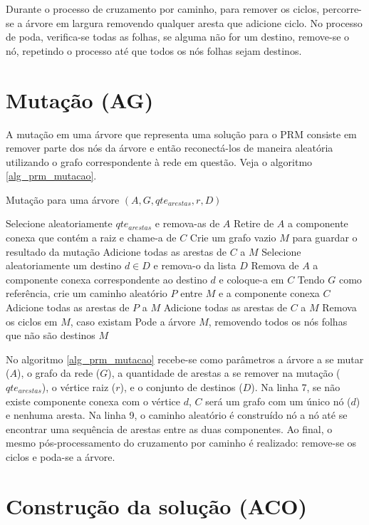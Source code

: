 Durante o processo de cruzamento por caminho, para remover os ciclos, percorre-se a árvore em largura removendo qualquer aresta que adicione ciclo. No processo de poda, verifica-se todas as folhas, se alguma não for um destino, remove-se o nó, repetindo o processo até que todos os nós folhas sejam destinos.

\section{Mutação (AG)}

A mutação em uma árvore que representa uma solução para o PRM consiste em remover parte dos nós da árvore e então reconectá-los de maneira aleatória utilizando o grafo correspondente à rede em questão. Veja o algoritmo \ref{alg_prm_mutacao}.

\begin{algorithm}
	\caption{Mutação para uma árvore $(A, G, qte_{arestas}, r, D)$}
	\label{alg_prm_mutacao}
	\begin{algorithmic}[1]
		\State Selecione aleatoriamente $qte_{arestas}$ e remova-as de $A$
		\State Retire de $A$ a componente conexa que contém a raiz e chame-a de $C$
		\State Crie um grafo vazio $M$ para guardar o resultado da mutação
		\State Adicione todas as arestas de $C$ a $M$
			\State Selecione aleatoriamente um destino $d \in D$ e remova-o da lista $D$
			\State Remova de $A$ a componente conexa correspondente ao destino $d$ e coloque-a em $C$
				\State Tendo $G$ como referência, crie um caminho aleatório $P$ entre $M$ e a componente conexa $C$
				\State Adicione todas as arestas de $P$ a $M$
			\EndIf
			\State Adicione todas as arestas de $C$ a $M$
		\EndWhile
		\State Remova os ciclos em $M$, caso existam
		\State Pode a árvore $M$, removendo todos os nós folhas que não são destinos
		\State \Return $M$
	\end{algorithmic}
\end{algorithm}

No algoritmo \ref{alg_prm_mutacao} recebe-se como parâmetros a árvore a se mutar ($A$), o grafo da rede ($G$), a quantidade de arestas a se remover na mutação ($qte_{arestas}$), o vértice raiz ($r$), e o conjunto de destinos ($D$). Na linha 7, se não existe componente conexa com o vértice $d$, $C$ será um grafo com um único nó ($d$) e nenhuma aresta. Na linha 9, o caminho aleatório é construído nó a nó até se encontrar uma sequência de arestas entre as duas componentes. Ao final, o mesmo pós-processamento do cruzamento por caminho é realizado: remove-se os ciclos e poda-se a árvore.

\section{Construção da solução (ACO)}


